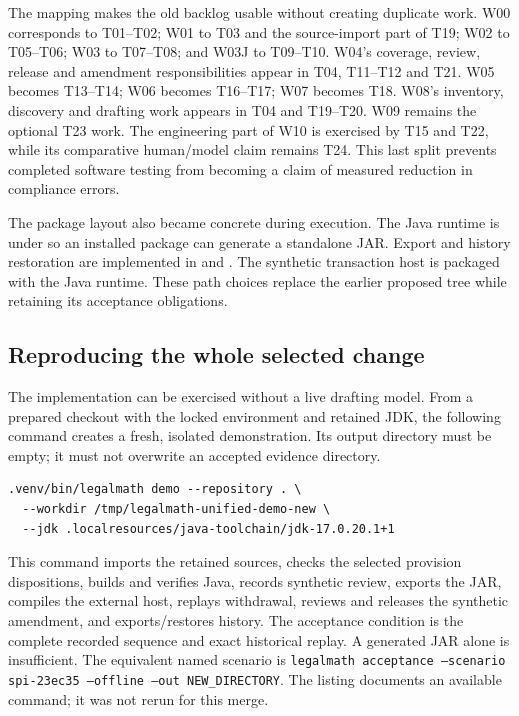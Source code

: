 \documentclass[12pt,a4paper,oneside,openany]{book}
\begin{document}
The mapping makes the old backlog usable without creating duplicate work.
W00 corresponds to T01--T02; W01 to T03 and the source-import part of T19;
W02 to T05--T06; W03 to T07--T08; and W03J to T09--T10. W04's coverage,
review, release and amendment responsibilities appear in T04, T11--T12 and
T21. W05 becomes T13--T14; W06 becomes T16--T17; W07 becomes T18.
W08's inventory, discovery and drafting work appears in T04 and T19--T20.
W09 remains the optional T23 work. The engineering part of W10 is exercised
by T15 and T22, while its comparative human/model claim remains T24. This
last split prevents completed software testing from becoming a claim of
measured reduction in compliance errors.

The package layout also became concrete during execution. The Java runtime is
under  so an installed package can generate a
standalone JAR. Export and history restoration are implemented in
 and
. The synthetic transaction host is
packaged with the Java runtime. These path choices replace the earlier proposed
tree while retaining its acceptance obligations.

\subsection{Reproducing the whole selected change}

The implementation can be exercised without a live drafting model. From a
prepared checkout with the locked environment and retained JDK, the following
command creates a fresh, isolated demonstration. Its output directory must be
empty; it must not overwrite an accepted evidence directory.

\begin{lstlisting}[caption={Reproduce the complete local workbench scenario in a new directory.}]
.venv/bin/legalmath demo --repository . \
  --workdir /tmp/legalmath-unified-demo-new \
  --jdk .localresources/java-toolchain/jdk-17.0.20.1+1
\end{lstlisting}

This command imports the retained sources, checks the selected provision
dispositions, builds and verifies Java, records synthetic review, exports the
JAR, compiles the external host, replays withdrawal, reviews and releases the
synthetic amendment, and exports/restores history. The acceptance condition is
the complete recorded sequence and exact historical replay. A generated JAR
alone is insufficient. The equivalent named scenario is
\texttt{legalmath acceptance --scenario spi-23ec35 --offline --out NEW\_DIRECTORY}.
The listing documents an available command; it was not rerun for this merge.
\end{document}

